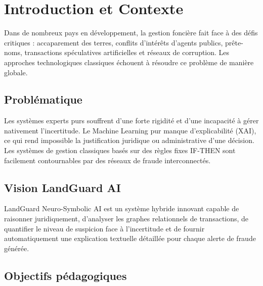 \documentclass[11pt,a4paper]{report}
\begin{document}
\tableofcontents
\clearpage

\chapter*{Introduction et Contexte}

Dans de nombreux pays en développement, la gestion foncière fait face à des défis critiques :
accaparement des terres, conflits d'intérêts d'agents publics, prête-noms, transactions
spéculatives artificielles et réseaux de corruption. Les approches technologiques classiques
échouent à résoudre ce problème de manière globale.

\section{Problématique}

Les systèmes experts purs souffrent d'une forte rigidité et d'une incapacité à gérer
nativement l'incertitude. Le Machine Learning pur manque d'explicabilité (XAI), ce qui
rend impossible la justification juridique ou administrative d'une décision. Les systèmes
de gestion classiques basés sur des règles fixes IF-THEN sont facilement contournables
par des réseaux de fraude interconnectés.

\section{Vision LandGuard AI}

LandGuard Neuro-Symbolic AI est un système hybride innovant capable de raisonner
juridiquement, d'analyser les graphes relationnels de transactions, de quantifier le
niveau de suspicion face à l'incertitude et de fournir automatiquement une explication
textuelle détaillée pour chaque alerte de fraude générée.

\section{Objectifs pédagogiques}
\end{document}
